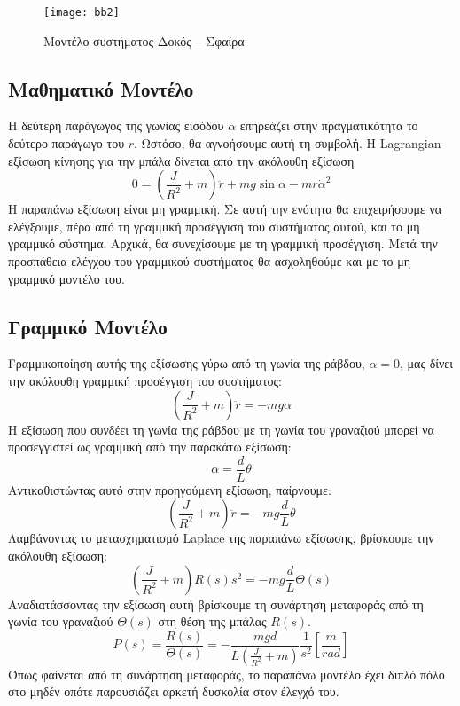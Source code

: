 \begin{figure}[h]
  \centering
  \texttt{[image: bb2]}
  \caption{Μοντέλο συστήματος Δοκός -- Σφαίρα}
  \label{fig:bb2}
\end{figure}

\subsection{Μαθηματικό Μοντέλο} \label{subsec:ball_beam_math_model}

Η δεύτερη παράγωγος της γωνίας εισόδου $\alpha$ επηρεάζει στην πραγματικότητα το δεύτερο παράγωγο του $r$. Ωστόσο, θα αγνοήσουμε αυτή τη συμβολή. Η Lagrangian εξίσωση κίνησης για την μπάλα δίνεται από την ακόλουθη εξίσωση
\begin{equation}
0 = \left(\frac{J}{R^2}+m\right)\ddot{r}+mg\sin\alpha - mr\dot{\alpha}^2
\label{eq:ball_beam_non_linear}
\end{equation}
Η παραπάνω εξίσωση είναι μη γραμμική. Σε αυτή την ενότητα θα επιχειρήσουμε να ελέγξουμε, πέρα από τη γραμμική προσέγγιση του συστήματος αυτού, και το μη γραμμικό σύστημα. Αρχικά, θα συνεχίσουμε με τη γραμμική προσέγγιση. Μετά την προσπάθεια ελέγχου του γραμμικού συστήματος θα ασχοληθούμε και με το μη γραμμικό μοντέλο του.

\subsection{Γραμμικό Μοντέλο}

Γραμμικοποίηση αυτής της εξίσωσης γύρω από τη γωνία της ράβδου, $\alpha = 0$, μας δίνει την ακόλουθη γραμμική προσέγγιση του συστήματος:
\begin{equation}
\left(\frac{J}{R^2}+m\right)\ddot{r} = -mg\alpha
\end{equation}
Η εξίσωση που συνδέει τη γωνία της ράβδου με τη γωνία του γραναζιού μπορεί να προσεγγιστεί ως γραμμική από την παρακάτω εξίσωση:
\begin{equation}
\alpha = \frac{d}{L}\theta
\label{eq:alpha_to_theta}
\end{equation}
Αντικαθιστώντας αυτό στην προηγούμενη εξίσωση, παίρνουμε:
\begin{equation}
\left(\frac{J}{R^2}+m\right)\ddot{r} = -mg\frac{d}{L}\theta
\end{equation}
Λαμβάνοντας το μετασχηματισμό Laplace της παραπάνω εξίσωσης, βρίσκουμε την ακόλουθη εξίσωση:
\begin{equation}
\left(\frac{J}{R^2}+m\right)R(s)s^2 = -mg\frac{d}{L}\Theta(s)
\end{equation}
Αναδιατάσσοντας την εξίσωση αυτή βρίσκουμε τη συνάρτηση μεταφοράς από τη γωνία του γραναζιού $\Theta(s)$ στη θέση της μπάλας $R(s)$.
\begin{equation}
P(s) = \frac{R(s)}{\Theta(s)} = -\frac{mgd}{L\left(\frac{J}{R^2}+m\right)}\frac{1}{s^2} \left[\frac{m}{rad}\right]
\end{equation} 
Όπως φαίνεται από τη συνάρτηση μεταφοράς, το παραπάνω μοντέλο έχει διπλό πόλο στο μηδέν οπότε παρουσιάζει αρκετή δυσκολία στον έλεγχό του.

